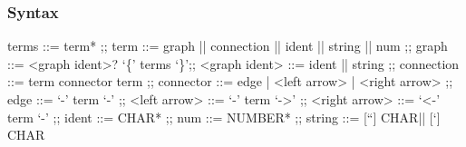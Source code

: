 
\subsubsection*{Syntax}
\begin{bnfgrammar}
	terms ::= term*
	;;
	term ::= graph || connection || ident || string || num ;;
	graph ::= <graph ident>? `\{' terms `\}';;
	<graph ident> ::= ident || string ;;
	connection ::= term connector term ;;
	connector ::= edge | <left arrow> | <right arrow> ;;
	edge ::= `-' term `-' ;;
	<left arrow> ::= `-' term `->' ;;
	<right arrow> ::= `<-' term `-' ;;
	ident ::= CHAR* ;;
	num ::= NUMBER* ;;
	string ::= [``] CHAR\* [''] || [`] CHAR\* [']
\end{bnfgrammar}


